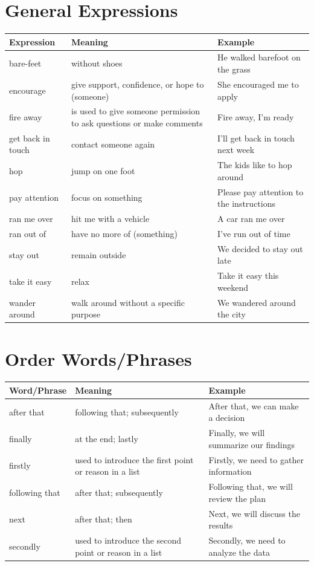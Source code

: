 \section{General Expressions}
\begin{longtable}{p{}p{}p{}}
\textbf{Expression} & \textbf{Meaning} & \textbf{Example} \\
\hline
\endhead
bare-feet & without shoes & He walked barefoot on the grass \\
encourage & give support, confidence, or hope to (someone) & She encouraged me to apply \\
fire away & is used to give someone permission to ask questions or make comments & Fire away, I'm ready \\
get back in touch & contact someone again & I'll get back in touch next week \\
hop & jump on one foot & The kids like to hop around \\
pay attention & focus on something & Please pay attention to the instructions \\
ran me over & hit me with a vehicle & A car ran me over \\
ran out of & have no more of (something) & I've run out of time \\
stay out & remain outside & We decided to stay out late \\
take it easy & relax & Take it easy this weekend \\
wander around & walk around without a specific purpose & We wandered around the city \\
\end{longtable}


\section{Order Words/Phrases}
\begin{longtable}{p{}p{}p{}}
\textbf{Word/Phrase} & \textbf{Meaning} & \textbf{Example} \\
\hline
\endhead
after that & following that; subsequently & After that, we can make a decision \\
\hline
finally & at the end; lastly & Finally, we will summarize our findings \\
\hline
firstly & used to introduce the first point or reason in a list & Firstly, we need to gather information \\
\hline
following that & after that; subsequently & Following that, we will review the plan \\
\hline
next & after that; then & Next, we will discuss the results \\
\hline
secondly & used to introduce the second point or reason in a list & Secondly, we need to analyze the data \\
\hline


\end{longtable} 

